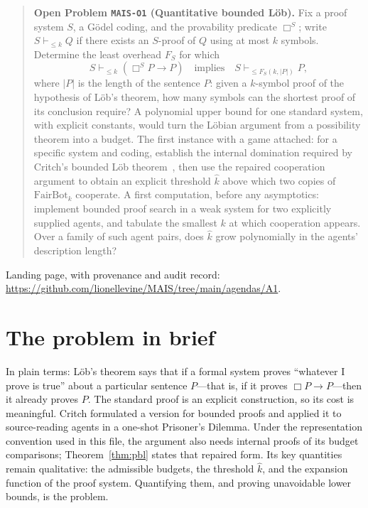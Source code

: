 \documentclass[11pt]{amsart}
\theoremstyle{plain}
\theoremstyle{definition}
\begin{document}
\begin{quote}
\textbf{Open Problem \texttt{MAIS-O1} (Quantitative bounded L\"ob).}
Fix a proof system $S$, a G\"odel coding, and the provability predicate $\Box^S$; write $S\vdash_{\le k}Q$ if there exists an $S$-proof of $Q$ using at most $k$ symbols. Determine the least overhead $F_S$ for which
\[
   S\vdash_{\le k}(\Box^S P\to P)
   \quad\text{implies}\quad
   S\vdash_{\le F_S(k,|P|)} P,
\]
where $|P|$ is the length of the sentence $P$: given a $k$-symbol proof of the hypothesis of L\"ob's theorem, how many symbols can the shortest proof of its conclusion require? A polynomial upper bound for one standard system, with explicit constants, would turn the L\"obian argument from a possibility theorem into a budget. The first instance with a game attached: for a specific system and coding, establish the internal domination required by Critch's bounded L\"ob theorem~\cite{critch2016}, then use the repaired cooperation argument to obtain an explicit threshold $\hat k$ above which two copies of $\mathrm{FairBot}_k$ cooperate. A first computation, before any asymptotics: implement bounded proof search in a weak system for two explicitly supplied agents, and tabulate the smallest $k$ at which cooperation appears. Over a family of such agent pairs, does $\hat k$ grow polynomially in the agents' description length?
\end{quote}

\noindent Landing page, with provenance and audit record: \url{https://github.com/lionellevine/MAIS/tree/main/agendas/A1}.

\section{The problem in brief}
\label{sec:brief}



In plain terms: L\"ob's theorem \cite{lob1955} says that if a formal system proves ``whatever I prove is true'' about a particular sentence $P$---that is, if it proves $\Box P\to P$---then it already proves $P$. The standard proof is an explicit construction, so its cost is meaningful. Critch \cite{critch2016} formulated a version for bounded proofs and applied it to source-reading agents in a one-shot Prisoner's Dilemma. Under the representation convention used in this file, the argument also needs internal proofs of its budget comparisons; Theorem~\ref{thm:pbl} states that repaired form. Its key quantities remain qualitative: the admissible budgets, the threshold $\hat k$, and the expansion function of the proof system. Quantifying them, and proving unavoidable lower bounds, is the problem.
\end{document}
